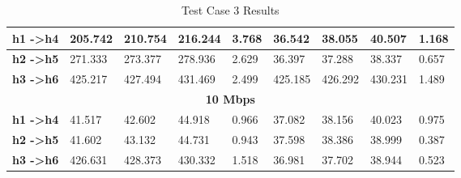 \begin{table}[h!]
\begin{tabular}{l|l|l|l|l|l|l|l|l|}
\multicolumn{1}{|l|}{\textbf{h1 -\textgreater h4}} & 205.742                           & 210.754                           & 216.244                           & 3.768                              & 36.542                            & 38.055                            & 40.507                            & 1.168                              \\ \hline
\multicolumn{1}{|l|}{\textbf{h2 -\textgreater h5}} & 271.333                           & 273.377                           & 278.936                           & 2.629                              & 36.397                            & 37.288                            & 38.337                            & 0.657                              \\ \hline
\multicolumn{1}{|l|}{\textbf{h3 -\textgreater h6}} & 425.217                           & 427.494                           & 431.469                           & 2.499                              & 425.185                           & 426.292                           & 430.231                           & 1.489                              \\ \hline
\multicolumn{9}{|c|}{\textbf{10 Mbps}}                                                                                                                                                                                                                                                                                                               \\ \hline
\multicolumn{1}{|l|}{\textbf{h1 -\textgreater h4}} & 41.517                            & 42.602                            & 44.918                            & 0.966                              & 37.082                            & 38.156                            & 40.023                            & 0.975                              \\ \hline
\multicolumn{1}{|l|}{\textbf{h2 -\textgreater h5}} & 41.602                            & 43.132                            & 44.731                            & 0.943                              & 37.598                            & 38.386                            & 38.999                            & 0.387                              \\ \hline
\multicolumn{1}{|l|}{\textbf{h3 -\textgreater h6}} & 426.631                           & 428.373                           & 430.332                           & 1.518                              & 36.981                            & 37.702                            & 38.944                            & 0.523                              \\ \hline
\end{tabular}
\caption{Test Case 3 Results}
\label{table:test3}
\end{table}

